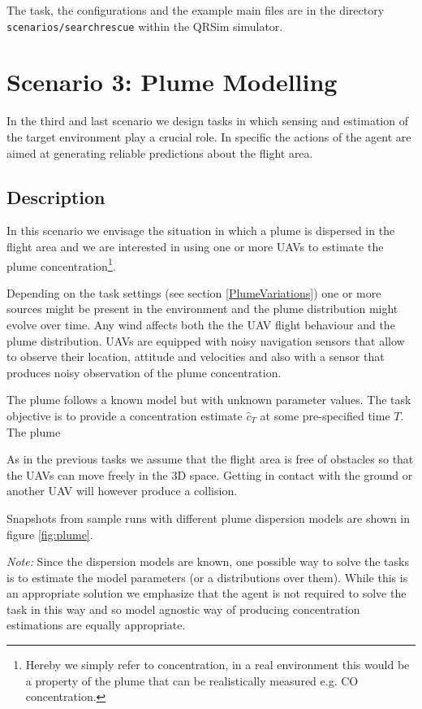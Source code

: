 \documentclass[a4paper,11pt]{report}
\newcommand{\sname}{QRSim\xspace}
\newcommand\mytexttt[1]{\texttt{\hyphenchar\font=45\relax #1}}
\begin{document}
The task, the configurations and the example main files are in the directory \mytexttt{scenarios/searchrescue} within the \sname simulator.

\newpage
\chapter{Scenario 3: Plume Modelling}
In the third and last scenario we design tasks in which sensing and estimation of the target environment play a crucial role. In specific the actions of the agent are aimed at generating reliable predictions about the flight area.  

\section{Description}

In this scenario we envisage the situation in which a plume is dispersed in the flight area and we are interested in using one or more UAVs to estimate the plume concentration\footnote{Hereby we simply refer to concentration, in a real environment this would be a property of the plume that can be realistically measured e.g. CO concentration.}.

Depending on the task settings (see section \ref{PlumeVariations}) one or more sources might be present in the environment and the plume distribution might evolve over time. Any wind affects both the the UAV flight behaviour and the plume distribution.
UAVs are equipped with noisy navigation sensors that allow to observe their location, attitude and velocities and also with a sensor that produces noisy observation of the plume concentration. 

The plume follows a known model but with unknown parameter values. The task objective is to provide a concentration estimate $\hat{c}_T$ at some pre-specified time $T$. The plume 



As in the previous tasks we assume that the flight area is free of obstacles so that the UAVs can move freely in the 3D space. Getting in contact with the ground or another UAV will however produce a collision.

Snapshots from sample runs with different plume dispersion models are shown in figure \ref{fig:plume}.

\textit{Note:}
Since the dispersion models are known, one possible way to solve the tasks is to estimate the model parameters (or a distributions over them). While this is an appropriate solution we emphasize that the agent is not required to solve the task in this way and so model agnostic way of producing concentration estimations are equally appropriate. 
\end{document}
